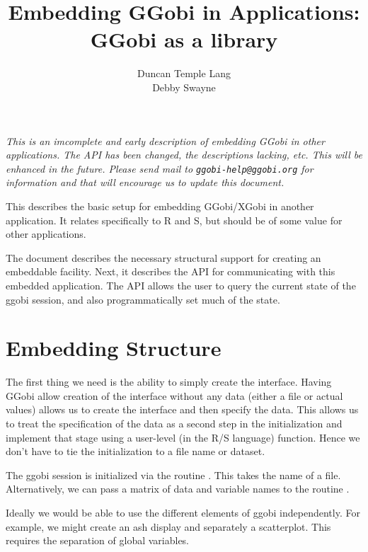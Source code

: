 \documentclass{article}
\title{Embedding GGobi in Applications: \\
GGobi as a library}
\author{Duncan Temple Lang\\
Debby Swayne}
\begin{document}
\maketitle

\textit{This is an imcomplete and early description of embedding GGobi
  in other applications. The API has been changed, the descriptions
  lacking, etc. This will be enhanced in the future.  Please send mail
  to \texttt{ggobi-help@ggobi.org} for information and that will
  encourage us to update this document.}

This describes the basic setup for embedding GGobi/XGobi in another
application.  It relates specifically to R and S, but should be of
some value for other applications.

The document describes the necessary structural support for creating
an embeddable facility.  Next, it describes the API for communicating
with this embedded application.  The API allows the user to query the
current state of the ggobi session, and also programmatically set much
of the state.


\section{Embedding Structure}
The first thing we need is the ability to simply create the interface.
Having GGobi allow creation of the interface without any data (either
a file or actual values) allows us to create the interface and then
specify the data. This allows us to treat the specification
of the data as a second step in the initialization
and implement that stage using a user-level (in the R/S language)
function. Hence we don't have to tie the initialization
to a file name or dataset.

The ggobi session is initialized via the routine .
This takes the name of a file.  Alternatively, we can pass a matrix of
data and variable names to the routine \Croutine{}.


Ideally we would be able to use the different elements of ggobi
independently. For example, we might create an ash display and
separately a scatterplot.  This requires the separation of global
variables.
\end{document}

